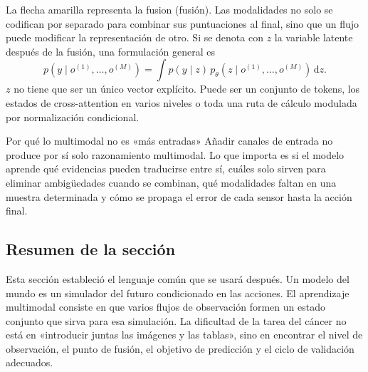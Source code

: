 La flecha amarilla representa la fusion (fusión). Las modalidades no solo se codifican por separado para combinar sus puntuaciones al final, sino que un flujo puede modificar la representación de otro. Si se denota con $z$ la variable latente después de la fusión, una formulación general es
\[
p(y\mid o^{(1)},\ldots,o^{(M)})
=\int p(y\mid z)\,p_\theta(z\mid o^{(1)},\ldots,o^{(M)})\,\mathrm{d}z.
\]
$z$ no tiene que ser un único vector explícito. Puede ser un conjunto de tokens, los estados de cross-attention en varios niveles o toda una ruta de cálculo modulada por normalización condicional.

\begin{knowledgebox}{Por qué lo multimodal no es «más entradas»}
Añadir canales de entrada no produce por sí solo razonamiento multimodal. Lo que importa es si el modelo aprende qué evidencias pueden traducirse entre sí, cuáles solo sirven para eliminar ambigüedades cuando se combinan, qué modalidades faltan en una muestra determinada y cómo se propaga el error de cada sensor hasta la acción final.
\end{knowledgebox}

\subsection{Resumen de la sección}

Esta sección estableció el lenguaje común que se usará después. Un modelo del mundo es un simulador del futuro condicionado en las acciones. El aprendizaje multimodal consiste en que varios flujos de observación formen un estado conjunto que sirva para esa simulación. La dificultad de la tarea del cáncer no está en «introducir juntas las imágenes y las tablas», sino en encontrar el nivel de observación, el punto de fusión, el objetivo de predicción y el ciclo de validación adecuados.
